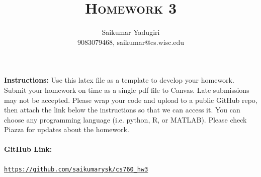 \documentclass[a4paper]{article}
\title{\textsc{Homework 3}} %
\author{
Saikumar Yadugiri \\
9083079468, saikumar@cs.wisc.edu\\
}
\date{}
\theoremstyle{definition}
\begin{document}
\maketitle 


\textbf{Instructions:} 
Use this latex file as a template to develop your homework. Submit your homework on time as a single pdf file to Canvas. Late submissions may not be accepted. Please wrap your code and upload to a public GitHub repo, then attach the link below the instructions so that we can access it. You can choose any programming language (i.e. python, R, or MATLAB). Please check Piazza for updates about the homework.

\paragraph{GitHub Link:} \href{https://github.com/saikumarysk/cs760_hw3}{\texttt{https://github.com/saikumarysk/cs760\_hw3}}
\end{document}
